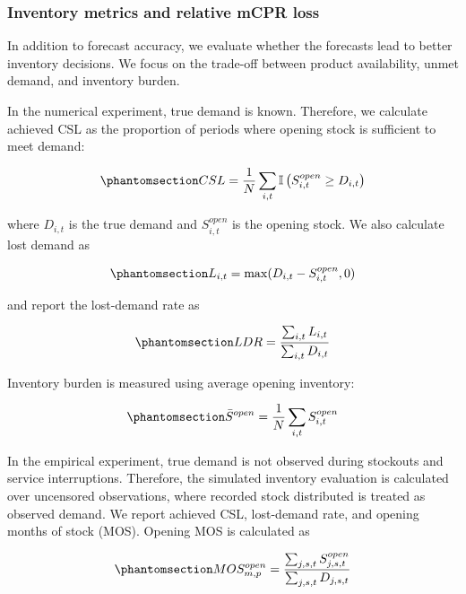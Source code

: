 \documentclass[
  authoryear,
  doubleblind,
  3p]{elsarticle}
\begin{document}
\subsubsection{Inventory metrics and relative mCPR
loss}\label{inventory-metrics-and-relative-mcpr-loss}

In addition to forecast accuracy, we evaluate whether the forecasts lead
to better inventory decisions. We focus on the trade-off between product
availability, unmet demand, and inventory burden.

In the numerical experiment, true demand is known. Therefore, we
calculate achieved CSL as the proportion of periods where opening stock
is sufficient to meet demand:

\begin{equation}\phantomsection\label{eq-csl}{
CSL = \frac{1}{N}\sum_{i,t} \mathbb{I}\left(S_{i,t}^{open} \geq D_{i,t}\right)
}\end{equation}

where \(D_{i,t}\) is the true demand and \(S_{i,t}^{open}\) is the
opening stock. We also calculate lost demand as

\begin{equation}\phantomsection\label{eq-ld}{
L_{i,t} = \max(D_{i,t} - S_{i,t}^{open},0)
}\end{equation}

and report the lost-demand rate as

\begin{equation}\phantomsection\label{eq-ldr}{
LDR = \frac{\sum_{i,t} L_{i,t}}{\sum_{i,t} D_{i,t}}
}\end{equation}

Inventory burden is measured using average opening inventory:

\begin{equation}\phantomsection\label{eq-avg_inv}{
\bar{S}^{open} = \frac{1}{N}\sum_{i,t} S_{i,t}^{open}
}\end{equation}

In the empirical experiment, true demand is not observed during
stockouts and service interruptions. Therefore, the simulated inventory
evaluation is calculated over uncensored observations, where recorded
stock distributed is treated as observed demand. We report achieved CSL,
lost-demand rate, and opening months of stock (MOS). Opening MOS is
calculated as

\begin{equation}\phantomsection\label{eq-mos}{
MOS^{open}_{m,p} =
\frac{\sum_{j,s,t} S_{j,s,t}^{open}}
{\sum_{j,s,t} D_{j,s,t}}
}\end{equation}
\end{document}
